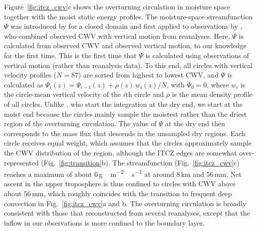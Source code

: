 \documentclass[acp, manuscript]{copernicus}
\begin{document}
Figure~\ref{fig:itcz_cwv}c shows the overturning circulation in moisture space together with the moist static energy profiles.
The moisture-space streamfunction $\Psi$ was introduced by \citet{Bretherton2005} for a closed domain and first applied to observations by \citet{schulzObservingTropicalAtmosphere2018}, who combined observed CWV with vertical motion from reanalyses.
Here, $\Psi$ is calculated from observed CWV and observed vertical motion, to our knowledge for the first time.
This is the first time that $\Psi$ is calculated using observations of vertical motion (rather than reanalysis data).
To this end, all circles with vertical velocity profiles ($N = 87$) are sorted from highest to lowest CWV, and $\Psi$ is calculated as $\Psi_i(z) = \Psi_{i-1}(z) + \overline{\rho}(z)\,w_i(z)/N$, with $\Psi_0 = 0$, where $w_i$ is the circle-mean vertical velocity of the $i$th circle and $\overline{\rho}$ is the mean density profile of all circles.
Unlike \citet{schulzObservingTropicalAtmosphere2018}, who start the integration at the dry end, we start at the moist end because the circles mainly sample the moistest rather than the driest region of the overturning circulation. The value of $\Psi$ at the dry end then corresponds to the mass flux that descends in the unsampled dry regions.
Each circle receives equal weight, which assumes that the circles approximately sample the CWV distribution of the region, although the ITCZ edges are somewhat over-represented (Fig.~\ref{fig:transition}b).
The streamfunction (Fig.~\ref{fig:itcz_cwv}c) reaches a maximum of about 6\,\unit{g\,m^{-2}\,s^{-1}} at around 8\,\unit{km} and 56\,\unit{mm}. Net ascent in the upper troposphere is thus confined to circles with CWV above about 56\,\unit{mm}, which roughly coincides with the transition to frequent deep convection in Fig.~\ref{fig:itcz_cwv}a and b. 
The overturning circulation is broadly consistent with those that \citet{schulzObservingTropicalAtmosphere2018} reconstructed from several reanalyses, except that the inflow in our observations is more confined to the boundary layer.
\end{document}
